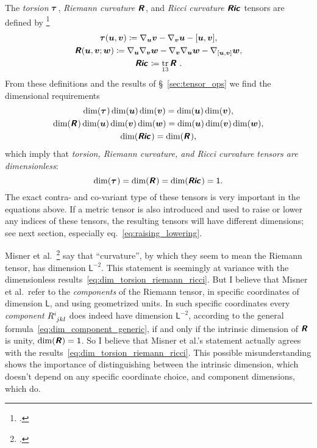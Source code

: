 \documentclass[a4paper,12pt,onecolumn,oneside,article,british]{memoir}
\makeatletter
\newcommand*{\mathte}[1]{\textbf{\textit{\textsf{#1}}}}
\newcommand*{\citep}{\footcites}
\DeclareMathOperator{\tr}{tr}%
\newcommand*{\defd}{\coloneqq}
\DeclarePairedDelimiter\clcl{[}{]}
\newcommand*{\sect}{\S}%
\newcommand*{\eqn}{eq.}%
\newcommand*{\etal}{{et al.}}
\newcommand*{\q}{}%
\DeclareRobustCommand*{\q}{%
  \mathbin{\mathpalette\bigcdot@{}}%
}
\newcommand*{\bigcdot@scalefactor}{0.7}
\newcommand*{\bigcdot@widthfactor}{1.5}
\newcommand*{\bigcdot@}[2]{%
  \sbox0{$#1\vcenter{}$}%
  \sbox2{$#1\cdot\m@th$}%
  \hbox to \bigcdot@widthfactor\wd2{%
    \hfil
    \raise\ht0\hbox{%
      \scalebox{\bigcdot@scalefactor}{%
        \lower\ht0\hbox{$#1\bullet\m@th$}%
      }%
    }%
    \hfil
  }%
}
\newcommand*{\Un}{\textsf{1}}
\newcommand*{\Le}{\textsf{L}}
\newcommand*{\yR}{\mathte{R}}
\newcommand*{\yRi}{\mathte{Ric}}
\newcommand*{\yTo}{\bm{\tau}}
\newcommand*{\yv}{\bm{v}}
\newcommand*{\yu}{\bm{u}}
\newcommand*{\yw}{\bm{w}}
\renewcommand*{\i}{\indices}
\newcommand*{\nab}{\nabla}
\makeatother
\begin{document}
The \emph{torsion} $\yTo\i{^{\q}_{\q\q}}$, \emph{Riemann
  curvature} $\yR\i{^{\q}_{\q\q\q}}$, and \emph{Ricci
  curvature} $\yRi\i{_{\q\q}}$ tensors are defined by
\citep[\sect~V.B.1]{choquetbruhatetal1977_r1996}
\begin{gather}
  \label{eq:torsion_eq}
\yTo(\yu,\yv) \defd \nab_{\yu}\yv - \nab_{\yv}\yu - \clcl{\yu,\yv},
\\
\yR(\yu,\yv;\yw) \defd
\nab_{\yu}\nab_{\yv}\yw - \nab_{\yv}\nab_{\yu}\yw
- \nab_{\clcl{\yu,\yv}}\yw,
  \label{eq:riemann_eq}  
\\
\yRi\i{_{\q\q}} \defd \tr_{13} \yR\i{^{\q}_{\q\q\q}} \;.
  \label{eq:ricci_eq}  
\end{gather}
From these definitions and the results of \sect~\ref{sec:tensor_ops} we
find the dimensional requirements
\begin{gather}
  \label{eq:torsion_eq_dim}
\dim(\yTo\i{^{\q}_{\q\q}})\dim(\yu)\dim(\yv) = \dim(\yu) \dim(\yv),
\\
\dim(\yR\i{^{\q}_{\q\q\q}})\dim(\yu)\dim(\yv)\dim(\yw) =
\dim(\yu)\dim(\yv)\dim(\yw),
\label{eq:riemann_eq_dim}
\\
\dim(\yRi\i{_{\q\q}}) = \dim(\yR\i{^{\q}_{\q\q\q}}),
  \label{eq:ricci_eq_dim}  
\end{gather}
which imply that \emph{torsion, Riemann curvature, and Ricci curvature
  tensors are dimensionless}:
\begin{equation}
  \label{eq:dim_torsion_riemann_ricci}
  \dim(\yTo\i{^{\q}_{\q\q}}) =
   \dim(\yR\i{^{\q}_{\q\q\q}}) =
   \dim(\yRi\i{_{\q\q}}) =\Un.
\end{equation}
The exact contra- and co-variant type of these tensors is very important in
the equations above. If a metric tensor is also introduced and used to
raise or lower any indices of these tensors, the resulting tensors will
have different dimensions; see next section, especially
\eqn~\eqref{eq:raising_lowering}.

Misner \etal\ \citep[p.~35%
]{misneretal1970_r1973} say that \enquote{curvature}, by which they seem to
mean the Riemann tensor, has dimension $\Le^{-2}$. This statement is
seemingly at variance with the dimensionless
results~\eqref{eq:dim_torsion_riemann_ricci}. But I believe that Misner
\etal\ refer to the \emph{components} of the Riemann tensor, in specific
coordinates of dimension $\Le$, and using geometrized units. In such
specific coordinates every \emph{component} $R\i{^{i}_{jkl}}$ does indeed
have dimension $\Le^{-2}$, according to the general
formula~\eqref{eq:dim_component_generic}, if and only if the intrinsic
dimension of $\yR$ is unity, $\dim(\yR)=\Un$. So I believe that Misner
\etal's statement actually agrees with the
results~\eqref{eq:dim_torsion_riemann_ricci}. This possible
misunderstanding shows the importance of distinguishing between the
intrinsic dimension, which doesn't depend on any specific coordinate
choice, and component dimensions, which do.
\end{document}
